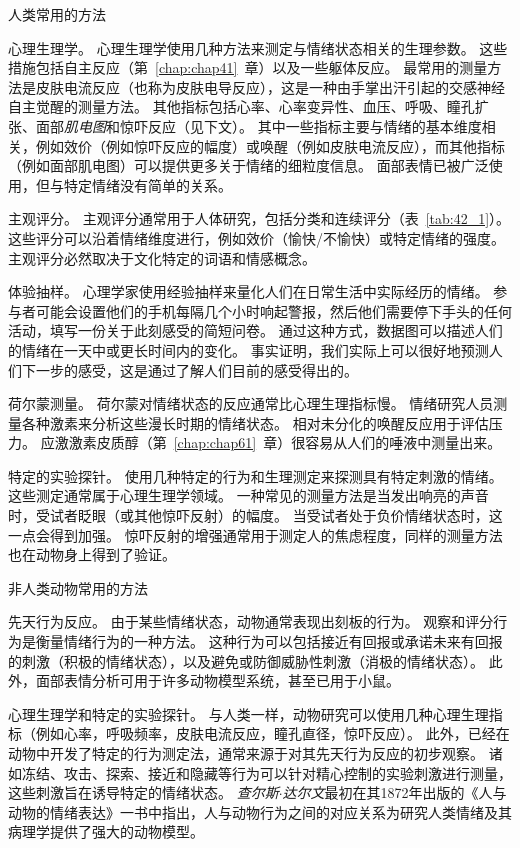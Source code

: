 \begin{proposition}[测量情绪的方法] \label{box:42_1}
	
	\quad \quad 人类常用的方法
	
	\quad \quad 心理生理学。
	心理生理学使用几种方法来测定与情绪状态相关的生理参数。
	这些措施包括自主反应（第~\ref{chap:chap41}~章）以及一些躯体反应。
	最常用的测量方法是皮肤电流反应（也称为皮肤电导反应），这是一种由手掌出汗引起的交感神经自主觉醒的测量方法。
	其他指标包括心率、心率变异性、血压、呼吸、瞳孔扩张、面部\textit{肌电图}和惊吓反应（见下文）。
	其中一些指标主要与情绪的基本维度相关，例如效价（例如惊吓反应的幅度）或唤醒（例如皮肤电流反应），而其他指标（例如面部肌电图）可以提供更多关于情绪的细粒度信息。
	面部表情已被广泛使用，但与特定情绪没有简单的关系。
	
	\quad \quad 主观评分。
	主观评分通常用于人体研究，包括分类和连续评分（表~\ref{tab:42_1}）。
	这些评分可以沿着情绪维度进行，例如效价（愉快/不愉快）或特定情绪的强度。
	主观评分必然取决于文化特定的词语和情感概念。
	
	\quad \quad 体验抽样。
	心理学家使用经验抽样来量化人们在日常生活中实际经历的情绪。
	参与者可能会设置他们的手机每隔几个小时响起警报，然后他们需要停下手头的任何活动，填写一份关于此刻感受的简短问卷。
	通过这种方式，数据图可以描述人们的情绪在一天中或更长时间内的变化。
	事实证明，我们实际上可以很好地预测人们下一步的感受，这是通过了解人们目前的感受得出的。
	
	\quad \quad 荷尔蒙测量。
	荷尔蒙对情绪状态的反应通常比心理生理指标慢。
	情绪研究人员测量各种激素来分析这些漫长时期的情绪状态。
	相对未分化的唤醒反应用于评估压力。
	应激激素皮质醇（第~\ref{chap:chap61}~章）很容易从人们的唾液中测量出来。
	
	\quad \quad 特定的实验探针。
	使用几种特定的行为和生理测定来探测具有特定刺激的情绪。
	这些测定通常属于心理生理学领域。
	一种常见的测量方法是当发出响亮的声音时，受试者眨眼（或其他惊吓反射）的幅度。
	当受试者处于负价情绪状态时，这一点会得到加强。
	惊吓反射的增强通常用于测定人的焦虑程度，同样的测量方法也在动物身上得到了验证。
	
	\quad \quad 非人类动物常用的方法
	
	\quad \quad 先天行为反应。
	由于某些情绪状态，动物通常表现出刻板的行为。
	观察和评分行为是衡量情绪行为的一种方法。
	这种行为可以包括接近有回报或承诺未来有回报的刺激（积极的情绪状态），以及避免或防御威胁性刺激（消极的情绪状态）。
	此外，面部表情分析可用于许多动物模型系统，甚至已用于小鼠。
	
	\quad \quad 心理生理学和特定的实验探针。
	与人类一样，动物研究可以使用几种心理生理指标（例如心率，呼吸频率，皮肤电流反应，瞳孔直径，惊吓反应）。
	此外，已经在动物中开发了特定的行为测定法，通常来源于对其先天行为反应的初步观察。
	诸如冻结、攻击、探索、接近和隐藏等行为可以针对精心控制的实验刺激进行测量，这些刺激旨在诱导特定的情绪状态。
	\textit{查尔斯$\cdot$达尔文}最初在其1872年出版的《人与动物的情绪表达》一书中指出，人与动物行为之间的对应关系为研究人类情绪及其病理学提供了强大的动物模型。
	
\end{proposition}


